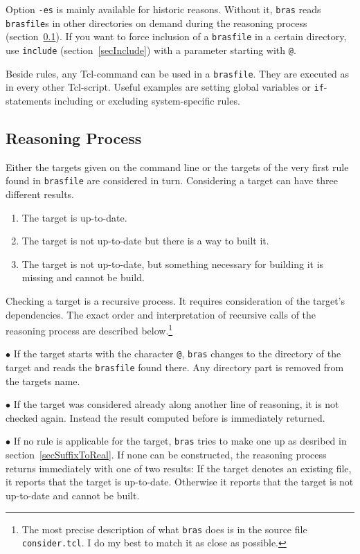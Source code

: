 \documentclass[12pt]{article}
\newcommand{\bras}{\texttt{bras}}
\begin{document}
Option \texttt{-es} is mainly available for historic reasons. Without
it, \bras{} reads \texttt{brasfile}s in other directories on demand
during the reasoning process (section~\ref{secReasoning}). If you want
to force inclusion of a \texttt{brasfile} in a certain directory, use
\texttt{include} (section~\ref{secInclude}) with a parameter starting
with \texttt{@}.

Beside rules, any Tcl-command can be used in a \texttt{brasfile}. They
are executed as in every other Tcl-script. Useful examples are setting
global variables or \texttt{if}-statements including or excluding
system-specific rules.

\subsection{Reasoning Process}
\label{secReasoning}
Either the targets given on the command line or the targets of the
very first rule found in \texttt{brasfile} are considered in
turn. Considering a target can have three different results. 
\begin{enumerate}
\item
The target is up-to-date.
\item
The target is not up-to-date but there is a way to built it.
\item
The target is not up-to-date, but something necessary for building it
is missing and cannot be build.
\end{enumerate}
Checking a target is a recursive process. It requires consideration of
the target's dependencies. The exact order and interpretation of
recursive calls of the reasoning process are described
below.\footnote{The most precise description of what \bras{} does is
  in the source file \texttt{consider.tcl}. I do my best to match it
  as close as possible.}

$\bullet$ If the target starts with the character \texttt{@}, \bras{}
changes to the directory of the target and reads the \texttt{brasfile}
found there. Any directory part is removed from the targets name.

$\bullet$ If the target was considered already along another line of
reasoning, it is not checked again. Instead the result computed before
is immediately returned.

$\bullet$ If no rule is applicable for the target, \bras{} tries to
make one up as desribed in section~\ref{secSuffixToReal}. If none can be
constructed, the reasoning process returns immediately with one of two
results: If the target denotes an existing file, it reports that the
target is up-to-date. Otherwise it reports that the target is not
up-to-date and cannot be built.
\end{document}
